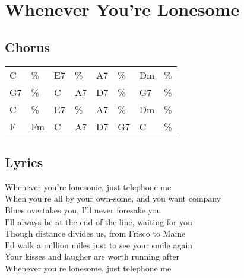\section{Whenever You're Lonesome}


\subsection*{Chorus}


\begin{tabular}{l l l l l l l l}
C & \% & E7 & \% & A7 & \% & Dm & \% \\ 
G7 & \% & C & A7 & D7 & \% & G7 & \% \\ 
C & \% & E7 & \% & A7 & \% & Dm & \% \\ 
F & Fm & C & A7 & D7 & G7 & C & \% \\ 
\end{tabular}


\subsection*{Lyrics}


Whenever you're lonesome, just telephone me \\ 
When you're all by your own-some, and you want company \\ 
Blues overtakes you, I'll never foresake you \\ 
I'll always be at the end of the line, waiting for you \\ 

Though distance divides us, from Frisco to Maine \\ 
I'd walk a million miles just to see your smile again \\ 
Your kisses and laugher are worth running after \\ 
Whenever you're lonesome, just telephone me \\ 
